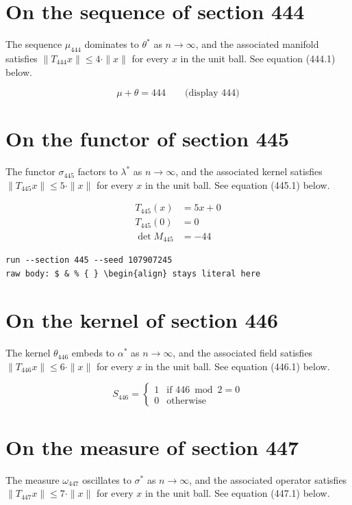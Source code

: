 \documentclass{article}
\begin{document}
\section{On the sequence of section 444}
The sequence $\mu_{444}$ dominates to $\theta^{*}$ as $n \to \infty$,
and the associated manifold satisfies $\|T_{444} x\| \leq 4 \cdot \|x\|$
for every $x$ in the unit ball. See equation (444.1) below.

$$
\mu + \theta = 444 \qquad \text{(display 444)}
$$

\section{On the functor of section 445}
The functor $\sigma_{445}$ factors to $\lambda^{*}$ as $n \to \infty$,
and the associated kernel satisfies $\|T_{445} x\| \leq 5 \cdot \|x\|$
for every $x$ in the unit ball. See equation (445.1) below.

\begin{align}
T_{445}(x) &= 5 x + 0 \\
T_{445}(0) &= 0 \\
\det M_{445} &= -44
\end{align}

\begin{verbatim}
run --section 445 --seed 107907245
raw body: $ & % { } \begin{align} stays literal here
\end{verbatim}

\section{On the kernel of section 446}
The kernel $\theta_{446}$ embeds to $\alpha^{*}$ as $n \to \infty$,
and the associated field satisfies $\|T_{446} x\| \leq 6 \cdot \|x\|$
for every $x$ in the unit ball. See equation (446.1) below.

\begin{equation}
S_{446} = \begin{cases} 1 & \text{if } 446 \bmod 2 = 0 \\ 0 & \text{otherwise} \end{cases}
\end{equation}

\section{On the measure of section 447}
The measure $\omega_{447}$ oscillates to $\sigma^{*}$ as $n \to \infty$,
and the associated operator satisfies $\|T_{447} x\| \leq 7 \cdot \|x\|$
for every $x$ in the unit ball. See equation (447.1) below.
\end{document}
